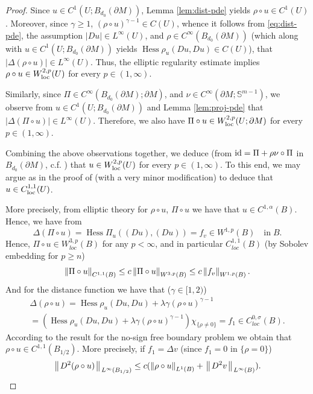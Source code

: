 \documentclass[11pt]{amsart}
\newcommand{\Ss}{{\mathbb S}}
\def\loc{{\textup{loc}}}
\def\id{{\rm id}}
\def\loc{{\textup{loc}}}
\newcommand{\Hess}{\operatorname{Hess}}
\newcommand\norm[1]{\left\Arrowvert {#1} \right\Arrowvert}
\theoremstyle{plain}
\theoremstyle{definition}
\theoremstyle{remark}
\numberwithin{equation}{section}
\begin{document}
\begin{proof}
    Since $u\in C^1(U;B_{d_0}(\partial M))$, Lemma \ref{lem:dist-pde} yields $\rho\circ u\in C^1(U)$. Moreover, since $\gamma \geq 1$, $(\rho\circ u)^{\gamma-1}\in C(U)$, whence it follows from \eqref{eq:dist-pde}, the assumption $|Du|\in L^\infty(U)$, and $\rho\in C^\infty(B_{d_0}(\partial M))$ (which along with $u \in C^1(U; B_{d_0}(\partial M))$ yields 
    $\Hess\rho_u(Du,Du) \in C(U)$), that $|\Delta (\rho\circ u)| \in L^\infty(U)$. Thus, the elliptic regularity estimate implies $\rho\circ u \in W_\loc^{2,p}(U)$ for every $p\in(1,\infty)$. 

    Similarly, since $\Pi\in C^\infty(B_{d_0}(\partial M);\partial M)$, and $\nu\in C^\infty(\partial M;\Ss^{m-1})$, we observe from $u\in C^1(U;B_{d_0}(\partial M))$ and Lemma \ref{lem:proj-pde} that $|\Delta(\Pi\circ u)| \in L^\infty(U)$. Therefore, we also have $\Pi\circ u \in W_\loc^{2,p}(U;\partial M)$ for every $p\in (1,\infty)$. 



    Combining the above observations together, we deduce (from $\id = \Pi + \rho \nu\circ \Pi$ in $B_{d_0}(\partial M)$, c.f. \cite[Eq.\ (2.1)]{FGKS1}) that $u \in W_\loc^{2,p}(U)$ for every $p \in (1,\infty)$. To this end, we may argue as in the proof of \cite[Lemma A.3--A.4]{FKS} (with a very minor modification) to deduce that $u\in C_\loc^{1,1}(U)$. 
    
    
    
    More precisely, from elliptic theory for $\rho \circ u$, $\Pi \circ u$ we have that $u\in C^{1,\alpha}(B)$. Hence, we have from \cite[(4.2)]{FKS}
\begin{equation*}
    \Delta (\Pi \circ u) = \Hess \Pi_u ((Du), (Du)) = f_v \in W^{1,p}(B) \quad \text{in} \; B.
\end{equation*}
Hence, $\Pi\circ u \in W^{3,p}_{loc}(B)$ for any $p<\infty$, and in particular $C^{1,1}_{loc}(B)$ (by Sobolev embedding for $p \geq n$)
\begin{equation*}
    \norm{\Pi \circ u}_{C^{1,1}(B)} \leq c \norm{\Pi\circ u}_{W^{3,p}(B)} \leq c \norm{f_v}_{W^{1,p}(B)}.
\end{equation*}
And for the distance function we have that ($\gamma \in [1,2)$)
\begin{equation*}
    \begin{split}
        \Delta (\rho \circ u) = \Hess\rho_u(Du,Du) + \lambda\gamma(\rho\circ u)^{\gamma-1} \\= (\Hess\rho_u(Du,Du) + \lambda\gamma(\rho\circ u)^{\gamma-1})\chi_{\{\rho \neq 0\}} = f_1 \in C^{0,\sigma}_{loc} (B).
    \end{split}
\end{equation*}
According to the result for the no-sign free boundary problem \cite{ALS} we obtain that $\rho \circ u \in C^{1,1}(B_{1/2})$. More precisely, if $f_1 = \Delta v$ (since $f_1 = 0$ in $\{\rho = 0\}$)
\begin{equation*}
    \norm{D^2 (\rho \circ u)}_{L^{\infty}(B_{1/2})} \leq c (\norm{\rho \circ u}_{L^1(B)} + \norm{D^2 v}_{L^\infty(B)}).
\end{equation*}


\end{proof}
\end{document}

